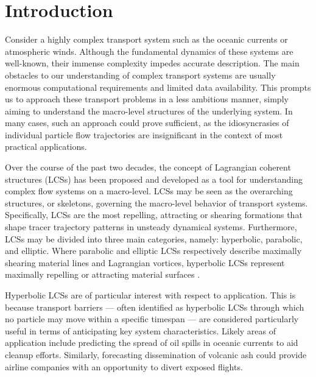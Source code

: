 \chapter{Introduction}


Consider a highly complex transport system such as the oceanic currents or atmospheric winds. Although the fundamental dynamics of these systems are well-known, their immense complexity impedes accurate description. The main obstacles to our understanding of complex transport systems are usually enormous computational requirements and limited data availability. This prompts us to approach these transport problems in a less ambitious manner, simply aiming to understand the macro-level structures of the underlying system. In many cases, such an approach could prove sufficient, as the idiosyncrasies of individual particle flow trajectories are insignificant in the context of most practical applications.

Over the course of the past two decades, the concept of Lagrangian coherent structures (LCSs) has been proposed and developed as a tool for understanding complex flow systems on a macro-level. LCSs may be seen as the overarching structures, or skeletons, governing the macro-level behavior of transport systems. Specifically, LCSs are the most repelling, attracting or shearing formations that shape tracer trajectory patterns in unsteady dynamical systems. Furthermore, LCSs may be divided into three main categories, namely: hyperbolic, parabolic, and elliptic. Where parabolic and elliptic LCSs respectively describe maximally shearing material lines and Lagrangian vortices, hyperbolic LCSs represent maximally repelling or attracting material surfaces \citep{LCSreview}. 

Hyperbolic LCSs are of particular interest with respect to application. This is because transport barriers --- often identified as hyperbolic LCSs through which no particle may move within a specific timespan --- are considered particularly useful in terms of anticipating key system characteristics. Likely areas of application include predicting the spread of oil spills in oceanic currents to aid cleanup efforts. Similarly, forecasting dissemination of volcanic ash could provide airline companies with an opportunity to divert exposed flights.

